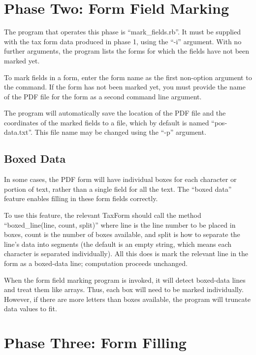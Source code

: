 \documentclass[12pt]{article}
\begin{document}
\section{Phase Two: Form Field Marking}

The program that operates this phase is ``mark\_fields.rb''. It must be supplied
with the tax form data produced in phase 1, using the ``-i'' argument. With no
further arguments, the program lists the forms for which the fields have not
been marked yet.

To mark fields in a form, enter the form name as the first non-option argument
to the command. If the form has not been marked yet, you must provide the name
of the PDF file for the form as a second command line argument.

The program will automatically save the location of the PDF file and the
coordinates of the marked fields to a file, which by default is named
``pos-data.txt''. This file name may be changed using the ``-p'' argument.




\subsection{Boxed Data}

In some cases, the PDF form will have individual boxes for each character or
portion of text, rather than a single field for all the text. The ``boxed data''
feature enables filling in these form fields correctly.

To use this feature, the relevant TaxForm should call the method
``boxed\_line(line, count, split)'' where line is the line number to be placed
in boxes, count is the number of boxes available, and split is how to separate
the line's data into segments (the default is an empty string, which means each
character is separated individually). All this does is mark the relevant line in
the form as a boxed-data line; computation proceeds unchanged.

When the form field marking program is invoked, it will detect boxed-data lines
and treat them like arrays. Thus, each box will need to be marked individually.
However, if there are more letters than boxes available, the program will
truncate data values to fit.






\section{Phase Three: Form Filling}
\end{document}
